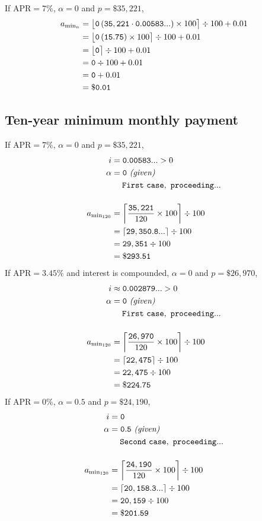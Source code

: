 \documentclass[12pt,letterpaper,oneside]{article}
\theoremstyle{remark} %
\begin{document}
	If $\mbox{APR}=7\%$, $\alpha=0$ and $p=\$35,221$,
	\begin{align*}
	a_{\rm{min_{\mathnormal{n}}}}&=\big\lfloor{\mathtt{0}\left(\mathtt{35,221}\cdot\mathtt{0.00583...}\right)\times 100}\big\rceil\div 100+0.01\\
	&=\big\lfloor{\mathtt{0}\left(\mathtt{15.75}\right)\times 100}\big\rceil\div 100+0.01\\
	&=\big\lfloor{\mathtt{0}}\big\rceil\div 100+0.01\\
	&=\mathtt{0}\div 100+0.01\\
	&=\mathtt{0}+0.01\\
	&=\mathtt{\$0.01}\\
	\end{align*}	

	\newpage

	\subsection{Ten-year minimum monthly payment}
	If $\mbox{APR}=7\%$, $\alpha=0$ and $p=\$35,221$,
	\begin{align*}
	i&=\mathtt{0.00583...}>0\\
	\alpha&=\mathtt{0}\ \textit{(given)}\\
	&\quad\;\mathtt{First\ case,\ proceeding...}\\[12pt]
	a_{\rm{min_{120}}}&=\left\lceil{\frac{\mathtt{35,221}}{120}\times 100}\right\rceil\div 100\\
	&=\left\lceil{\mathtt{29,350.8...}}\right\rceil\div 100\\
	&=\mathtt{29,351}\div 100\\
	&=\mathtt{\$293.51}
	\end{align*}
	If $\mbox{APR}=3.45\%$ and interest is compounded, $\alpha=0$ and $p=\$26,970$,
	\begin{align*}
	i&\approx\mathtt{0.002879...}>0\\
	\alpha&=\mathtt{0}\ \textit{(given)}\\
	&\quad\;\mathtt{First\ case,\ proceeding...}\\[12pt]
	a_{\rm{min_{120}}}&=\left\lceil{\frac{\mathtt{26,970}}{120}\times 100}\right\rceil\div 100\\
	&=\left\lceil{\mathtt{22,475}}\right\rceil\div 100\\
	&=\mathtt{22,475}\div 100\\
	&=\mathtt{\$224.75}
	\end{align*}
	If $\mbox{APR}=0\%$, $\alpha=0.5$ and $p=\$24,190$,
	\begin{align*}
	i&=\mathtt{0}\\
	\alpha&=\mathtt{0.5}\ \textit{(given)}\\
	&\quad\;\mathtt{Second\ case,\ proceeding...}\\[12pt]
	a_{\rm{min_{120}}}&=\left\lceil{\frac{\mathtt{24,190}}{120}\times 100}\right\rceil\div 100\\
	&=\left\lceil{\mathtt{20,158.3...}}\right\rceil\div 100\\
	&=\mathtt{20,159}\div 100\\
	&=\mathtt{\$201.59}
	\end{align*}
\end{document}
